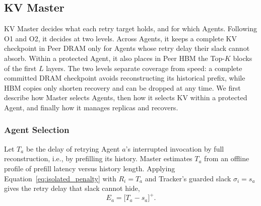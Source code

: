 \subsection{KV Master}
\label{sec:master}

KV Master decides what each retry target holds, and for which Agents.
Following O1 and O2, it decides at two levels. Across Agents, it keeps a
complete KV checkpoint in Peer DRAM only for Agents whose retry delay
their slack cannot absorb. Within a protected Agent, it also places in
Peer HBM the Top-$K$ blocks of the first $L$ layers. The two
levels separate coverage from speed: a complete committed DRAM checkpoint
avoids reconstructing its historical prefix, while HBM copies only
shorten recovery and can be dropped at any time. We first describe how
Master selects Agents, then how it selects KV within a protected Agent,
and finally how it manages replicas and recovers.

\subsubsection{Agent Selection}
\label{sec:agent-protection}

Let $T_a$ be the delay of retrying Agent $a$'s interrupted invocation by
full reconstruction, i.e., by prefilling its history. Master estimates
$T_a$ from an offline profile of prefill latency versus history length.
Applying Equation~\ref{eq:isolated_penalty} with $R_i=T_a$ and Tracker's
guarded slack $\sigma_i=s_a$ gives the retry delay that slack cannot hide,
\begin{equation}
 E_a=\bigl[T_a-s_a\bigr]^+.
 \label{eq:exposed-delay}
\end{equation}

